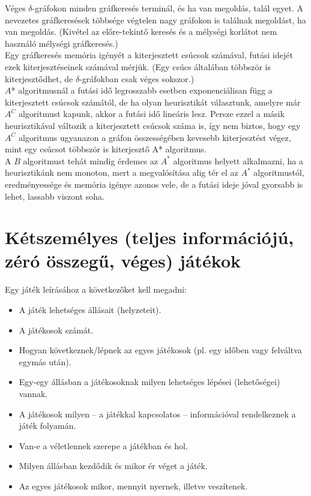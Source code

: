 \documentclass[12pt,margin=0px]{article}
\begin{document}
{    \noindent Véges $\delta$-gráfokon minden gráfkeresés terminál, és ha van megoldás, talál egyet. A nevezetes gráfkeresések többsége végtelen nagy gráfokon is találnak megoldást, ha van megoldás. (Kivétel az előre-tekintő keresés és a mélységi korlátot nem használó mélységi gráfkeresés.)\\

    \noindent Egy gráfkeresés memória igényét a kiterjesztett csúcsok számával, futási idejét ezek kiterjesztéseinek számával mérjük. (Egy csúcs általában többször is kiterjesztődhet, de $\delta$-gráfokban csak véges sokszor.)\\

    \noindent $A$* algoritmusnál a futási idő legrosszabb esetben exponenciálisan függ a kiterjesztett csúcsok számától, de ha olyan heurisztikát választunk, amelyre már $A^C$ algoritmust kapunk, akkor a futási idő lineáris lesz. Persze ezzel a másik heurisztikával változik a kiterjesztett csúcsok száma is, így nem biztos, hogy egy $A^C$ algoritmus ugyanazon a gráfon összességében kevesebb kiterjesztést végez, mint egy csúcsot többször is kiterjesztő A* algoritmus.\\

    \noindent A $B$ algoritmust tehát mindig érdemes az $A^*$ algoritmus helyett alkalmazni, ha a heurisztikánk nem monoton, mert a megvalósítása alig tér el az $A^*$ algoritmustól, eredményessége és memória igénye azonos vele, de a futási ideje jóval gyorsabb is lehet, lassabb viszont soha.
\newpage
	\section*{Kétszemélyes (teljes információjú, zéró összegű, véges) játékok}

    \noindent Egy játék leírásához a következőket kell megadni:
    \begin{itemize}
        \item A játék lehetséges állásait (helyzeteit).
        \item A játékosok számát.
        \item Hogyan következnek/lépnek az egyes játékosok (pl. egy időben vagy felváltva egymás után).
        \item Egy-egy állásban a játékosoknak milyen lehetséges lépései (lehetőségei) vannak.
        \item A játékosok milyen -- a játékkal kapcsolatos -- információval rendelkeznek a játék folyamán.
        \item Van-e a véletlennek szerepe a játékban és hol.
        \item Milyen állásban kezdődik és mikor ér véget a játék.
        \item Az egyes játékosok mikor, mennyit nyernek, illetve veszítenek.
    \end{itemize}

}
\end{document}
